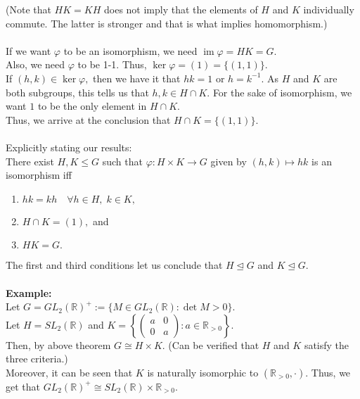 \documentclass[12 pt, a4paper, toc=graduated, oneside]{article}
\theoremstyle{definition}
\newcommand{\im}{\operatorname{im}}
\begin{document}
(Note that $HK = KH$ does not imply that the elements of $H$ and $K$ individually commute. The latter is stronger and that is what implies homomorphism.)\\~\\
If we want $\varphi$ to be an isomorphism, we need $\im \varphi = HK = G.$\\
Also, we need $\varphi$ to be 1-1. Thus, $\ker \varphi = (1) = \{(1, 1)\}.$\\
If $(h, k) \in \ker \varphi,$ then we have it that $hk = 1$ or $h = k^{-1}.$ As $H$ and $K$ are both subgroups, this tells us that $h, k \in H \cap K.$ For the sake of isomorphism, we want $1$ to be the only element in $H \cap K.$ \\
Thus, we arrive at the conclusion that $H \cap K = \{(1, 1)\}.$\\~\\
Explicitly stating our results:\\
There exist $H, K \le G$ such that $\varphi:H\times K \to G$ given by $(h, k) \mapsto hk$ is an isomorphism iff
\begin{enumerate}[nosep] 
 	\item $hk = kh \quad \forall h \in H,\; k\in K,$
 	\item $H \cap K = (1),$ and
 	\item $HK = G.$
\end{enumerate} 
The first and third conditions let us conclude that $H \trianglelefteq G$ and $K \trianglelefteq G.$\\~\\
%
\textbf{Example:}\\
Let $G = GL_2(\mathbb{R})^+ := \{M \in GL_2(\mathbb{R}) : \det M > 0\}.$\\
Let $H = SL_2(\mathbb{R})$ and $K = \left\{\begin{pmatrix}
a & 0\\
0 & a\end{pmatrix} : a \in \mathbb{R}_{> 0} \right\}.$\\
Then, by above theorem $G \cong H \times K.$ (Can be verified that $H$ and $K$ satisfy the three criteria.)\\
Moreover, it can be seen that $K$ is naturally isomorphic to $(\mathbb{R}_{>0}, \cdot).$ Thus, we get that $GL_2(\mathbb{R})^+ \cong SL_2(\mathbb{R}) \times \mathbb{R}_{>0}.$
\end{document}
